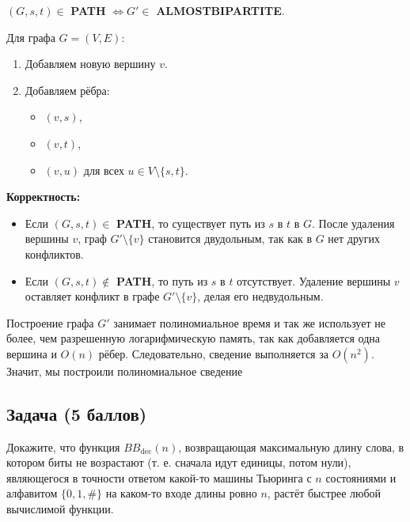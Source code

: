 \begin{solution}
\begin{enumerate}[label=\alph*.]
              $(G, s, t) \in$ \textbf{PATH} $\iff G' \in$ \textbf{ALMOSTBIPARTITE}.

              Для графа $G = (V, E)$:
              \begin{enumerate}
                  \item Добавляем новую вершину $v$.
                  \item Добавляем рёбра:
                        \begin{itemize}
                            \item $(v, s)$,
                            \item $(v, t)$,
                            \item $(v, u)$ для всех $u \in V \setminus \{s, t\}$.
                        \end{itemize}
              \end{enumerate}

              \textbf{Корректность:}

              \begin{itemize}
                  \item Если $(G, s, t) \in$ \textbf{PATH}, то существует путь из $s$ в $t$ в $G$. После удаления вершины $v$, граф $G' \setminus \{v\}$ становится двудольным, так как в $G$ нет других конфликтов.
                  \item Если $(G, s, t) \notin$ \textbf{PATH}, то путь из $s$ в $t$ отсутствует. Удаление вершины $v$ оставляет конфликт в графе $G' \setminus \{v\}$, делая его недвудольным.
              \end{itemize}

              Построение графа $G'$ занимает полиномиальное время и так же использует не более, чем разрешенную логарифмическую память,
              так как добавляется одна вершина и $O(n)$ рёбер. Следовательно, сведение выполняется за $O(n^2)$. 
              Значит, мы построили полиномиальное сведение

    \end{enumerate}
\end{solution}


\subsection{Задача \textbf{(5 баллов)}}

Докажите, что функция $BB_{\text{dec}}(n)$, возвращающая максимальную длину слова, в котором биты не возрастают
(т. е. сначала идут единицы, потом нули), являющегося в точности ответом какой-то машины Тьюринга с $n$ состояниями и
алфавитом $\{0, 1, \#\}$ на каком-то входе длины ровно $n$, растёт быстрее любой вычислимой функции.

